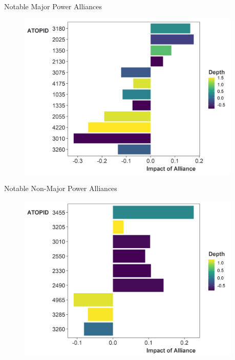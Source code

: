 \documentclass[12pt]{beamer}
\begin{document}
\begin{frame}{Notable Major Power Alliances}


\begin{figure}
	\centering
		\includegraphics[width=0.95\textwidth]{non-zero-maj.png}
	\label{fig:non-zero-maj}
\end{figure}


\end{frame}


\begin{frame}{Notable Non-Major Power Alliances}


\begin{figure}
	\centering
		\includegraphics[width=0.95\textwidth]{non-zero-min.png}
	\label{fig:non-zero-min}
\end{figure}


\end{frame}
\end{document}

